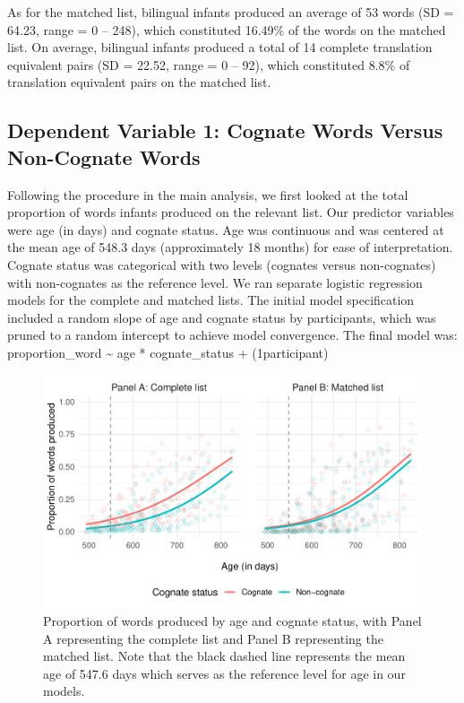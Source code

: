 \documentclass[
  ,man,floatsintext]{apa6}
\begin{document}
As for the matched list, bilingual infants produced an average of 53 words (SD = 64.23, range = 0 -- 248), which constituted 16.49\% of the words on the matched list. On average, bilingual infants produced a total of 14 complete translation equivalent pairs (SD = 22.52, range = 0 -- 92), which constituted 8.8\% of translation equivalent pairs on the matched list.

\hypertarget{dependent-variable-1-cognate-words-versus-non-cognate-words}{%
\subsection{Dependent Variable 1: Cognate Words Versus Non-Cognate Words}\label{dependent-variable-1-cognate-words-versus-non-cognate-words}}

Following the procedure in the main analysis, we first looked at the total proportion of words infants produced on the relevant list. Our predictor variables were age (in days) and cognate status. Age was continuous and was centered at the mean age of 548.3 days (approximately 18 months) for ease of interpretation. Cognate status was categorical with two levels (cognates versus non-cognates) with non-cognates as the reference level. We ran separate logistic regression models for the complete and matched lists. The initial model specification included a random slope of age and cognate status by participants, which was pruned to a random intercept to achieve model convergence. The final model was:
proportion\_word \textasciitilde{} age * cognate\_status + (1\textbar participant)

\begin{figure}

{\centering \includegraphics[width=1.2\linewidth]{CogVocab_supplemental_files/figure-latex/FigS1-1} 

}

\caption{Proportion of words produced by age and cognate status, with Panel A representing the complete list and Panel B representing the matched list. Note that the black dashed line represents the mean age of 547.6 days which serves as the reference level for age in our models.}\label{fig:FigS1}
\end{figure}
\end{document}
